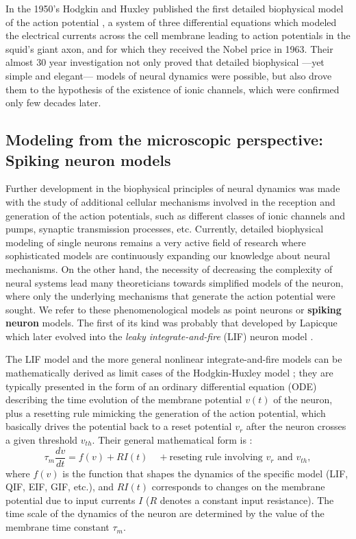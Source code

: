 In the 1950's Hodgkin and Huxley published the first detailed biophysical model
of the action potential \citep{Hodgkin1952}, a system of three differential equations
which modeled the electrical currents across the cell membrane leading to action potentials in
the squid's giant axon, and for which they received the Nobel price in
1963. Their almost 30 year investigation not only proved that 
detailed biophysical ---yet simple and elegant--- models of neural
dynamics were possible,  but
also drove them to the hypothesis of the existence of ionic channels,
which were confirmed only few decades later. 

\subsection*{Modeling from the microscopic perspective: Spiking neuron models}

Further development in the biophysical principles of neural dynamics
was made with the study of additional cellular mechanisms involved in
the reception and generation of the action potentials, such as
different classes of ionic channels and pumps, synaptic transmission processes,
etc. Currently, detailed biophysical modeling of single neurons
remains a very active field of research where sophisticated
models are continuously expanding our knowledge about neural
mechanisms. On the other hand, the necessity of decreasing the complexity
of neural systems lead many theoreticians towards simplified models
of the neuron, where only the underlying mechanisms that generate the
action potential were sought. We refer to these phenomenological
models as point neurons or \textbf{spiking neuron} models. The first
of its kind was probably that developed by Lapicque which
later evolved into the \textit{leaky integrate-and-fire} (LIF) neuron model
\citep{Stein1965,Kni72,Tuckwell1988}.

The LIF model and the more general nonlinear
integrate-and-fire models can be mathematically 
derived as limit cases of the Hodgkin-Huxley model
\citep[see~for~example][]{Gerstner2014}; they are typically presented
in the form of an ordinary differential equation (ODE) describing the time evolution of the
membrane potential $v(t)$ of the neuron, plus a resetting rule
mimicking the generation of the action potential, which basically drives the
potential back to a reset potential $v_r$ after the neuron crosses a given
threshold $v_{th}$. Their general mathematical form is
\citep{Abbott1993}:
\begin{equation}
\label{eq:if-eq}
\tau_m \frac{dv}{dt} = f(v) + RI(t) \quad +\text{reseting rule
  involving }v_r\text{ and }v_{th},
\end{equation}
where $f(v)$ is the function that shapes the dynamics of the specific
model (LIF, QIF, EIF, GIF, etc.), and $RI(t)$ corresponds to  changes on the
membrane potential due to input currents $I$ ($R$ denotes a constant
input resistance). The time scale of the dynamics of the neuron are
determined by the value of the membrane time constant $\tau_{m}$. 

